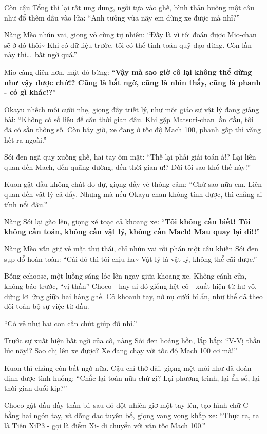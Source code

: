 \documentclass[../main.tex]{subfiles}
\begin{document}
Còn cậu Tổng thì lại rất ung dung, ngồi tựa vào ghế, bình thản buông một câu như đổ thêm dầu vào lửa: ``Anh tưởng vừa nãy em dừng xe được mà nhỉ?''

Nàng Mèo nhún vai, giọng vô cùng tự nhiên: ``Đấy là vì tôi đoán được Mio-chan sẽ ở đó thôi\~{} Khi có dữ liệu trước, tôi có thể tính toán quỹ đạo dừng. Còn lần này thì\dots\ bất ngờ quá.''

Mio càng điên hơn, mặt đỏ bừng: ``\textbf{Vậy mà sao giờ cô lại không thể dừng như vậy được chứ!? Cũng là bất ngờ, cũng là nhìn thấy, cũng là phanh - có gì khác!?}''

Okayu nhếch môi cười nhẹ, giọng đầy triết lý, như một giáo sư vật lý đang giảng bài: ``Không có số liệu để căn thời gian đâu. Khi gặp Matsuri-chan lần đầu, tôi đã có sẵn thông số. Còn bây giờ, xe đang ở tốc độ Mach 100, phanh gấp thì văng hết ra ngoài.''

Sói đen ngã quỵ xuống ghế, hai tay ôm mặt: ``Thế lại phải giải toán à!? Lại liên quan đến Mach, đến quãng đường, đến thời gian ư!? Đời tôi sao khổ thế này!''

Kuon gật đầu không chút do dự, giọng đầy vẻ thông cảm: ``Chứ sao nữa em. Liên quan đến vật lý cả đấy. Nhưng mà nếu Okayu-chan không tính được, thì chẳng ai tính nổi đâu.''

Nàng Sói lại gào lên, giọng xé toạc cả khoang xe: ``\textbf{Tôi không cần biết! Tôi không cần toán, không cần vật lý, không cần Mach! Mau quay lại đi!!}''

Nàng Mèo vẫn giữ vẻ mặt thư thái, chỉ nhún vai rồi phán một câu khiến Sói đen sụp đổ hoàn toàn: ``Cái đó thì tôi chịu ha\~{} Vật lý là vật lý, không thể cãi được.''

Bỗng cchoosc, một luồng sáng lóe lên ngay giữa khoang xe. Không cánh cửa, không báo trước, ``vị thần'' Choco - hay ai đó giống hệt cô - xuất hiện từ hư vô, đứng lơ lửng giữa hai hàng ghế. Cô khoanh tay, nở nụ cười bí ẩn, như thể đã theo dõi toàn bộ sự việc từ đầu.

``Có vẻ như hai con cần chút giúp đỡ nhỉ.''


Trước sự xuất hiện bất ngờ của cô, nàng Sói đen hoảng hồn, lắp bắp: ``V-Vị thần lúc nãy!? Sao chị lên xe được? Xe đang chạy với tốc độ Mach 100 cơ mà!''

Kuon thì chẳng còn bất ngờ nữa. Cậu chỉ thở dài, giọng mệt mỏi như đã đoán định được tình huống: ``Chắc lại toán nữa chứ gì? Lại phương trình, lại ẩn số, lại thời gian đuổi kịp?''

Choco gật đầu đầy thần bí, sau đó đột nhiên giơ một tay lên, tạo hình chữ C bằng hai ngón tay, và dõng dạc tuyên bố, giọng vang vọng khắp xe: ``Thực ra, ta là Tiên XiP3 - gọi là điểm Xi\footnotemark - di chuyển với vận tốc Mach 100.''
\end{document}
